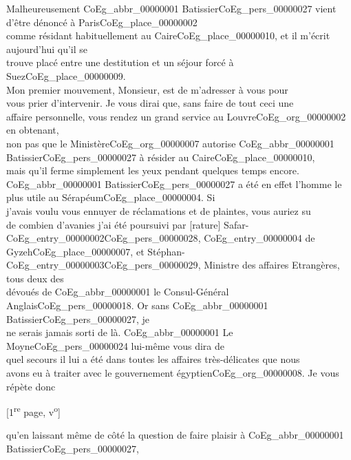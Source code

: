 \documentclass{book}
\begin{document}
\indent Malheureusement \gls{CoEg_abbr_00000001} Batissier\gls{CoEg_pers_00000027} vient d’être dénoncé à Paris\gls{CoEg_place_00000002}\\
comme résidant habituellement au Caire\gls{CoEg_place_00000010}, et il m’écrit aujourd’hui qu’il se\\
trouve placé entre une destitution et un séjour forcé à Suez\gls{CoEg_place_00000009}.\\
\indent Mon premier mouvement, Monsieur, est de m’adresser à vous pour\\
vous prier d’intervenir. Je vous dirai que, sans faire de tout ceci une\\
affaire personnelle, vous rendez un grand service au Louvre\gls{CoEg_org_00000002} en obtenant,\\
non pas que le Ministère\gls{CoEg_org_00000007} autorise \gls{CoEg_abbr_00000001} Batissier\gls{CoEg_pers_00000027} à résider au Caire\gls{CoEg_place_00000010},\\
mais qu’il ferme simplement les yeux pendant quelques temps encore.\\
\gls{CoEg_abbr_00000001} Batissier\gls{CoEg_pers_00000027} a été en effet l’homme le plus utile au Sérapéum\gls{CoEg_place_00000004}. Si\\
j’avais voulu vous ennuyer de réclamations et de plaintes, vous auriez su\\
de combien d’avanies j’ai été poursuivi par [rature] Safar-\Gls{CoEg_entry_00000002}\gls{CoEg_pers_00000028}, \gls{CoEg_entry_00000004} de\\
Gyzeh\gls{CoEg_place_00000007}, et Stéphan-\gls{CoEg_entry_00000003}\gls{CoEg_pers_00000029}, Ministre des affaires Etrangères, tous deux des\\
dévoués de \gls{CoEg_abbr_00000001} le Consul-Général Anglais\gls{CoEg_pers_00000018}. Or sans \gls{CoEg_abbr_00000001} Batissier\gls{CoEg_pers_00000027}, je\\
ne serais jamais sorti de là. \gls{CoEg_abbr_00000001} Le Moyne\gls{CoEg_pers_00000024} lui-même vous dira de\\
quel secours il lui a été dans toutes les affaires très-délicates que nous\\
avons eu à traiter avec le gouvernement égyptien\gls{CoEg_org_00000008}. Je vous répète donc
{\footnotesize \begin{center} [1\textsuperscript{re} page, v\textsuperscript{o}]\end{center}}
\noindent qu’en laissant même de côté la question de faire plaisir à \gls{CoEg_abbr_00000001} Batissier\gls{CoEg_pers_00000027},\\
\end{document}
